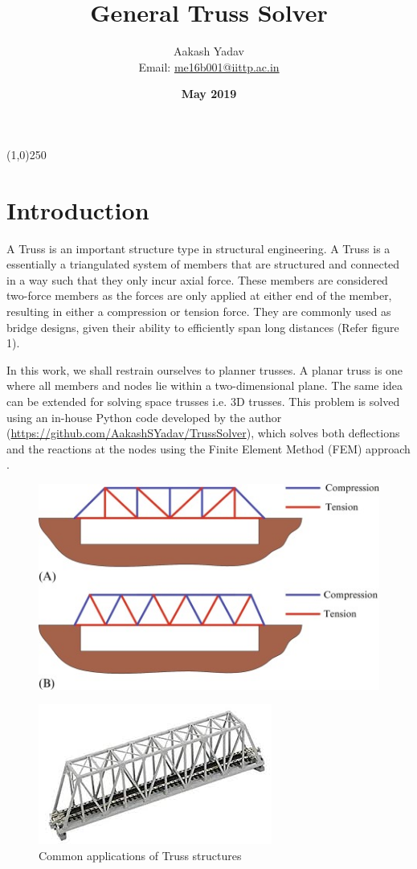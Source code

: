 \documentclass{article}
\title{\textbf{General Truss Solver}}
\author{Aakash Yadav\\ Email: \href{mailto:me16b001@iittp.ac.in}{me16b001@iittp.ac.in}}
\affil{\textbf{Indian Institute of Technology Tirupati}}
\date{\textbf{May 2019}}
\begin{document}
\maketitle

\begin{center}
\line(1,0){250}
\end{center}


\section{Introduction}
A Truss is an important structure type in structural engineering. A Truss is a essentially a triangulated system of members that are structured and connected in a way such that they only incur axial force. These members are considered two-force members as the forces are only applied at either end of the member, resulting in either a compression or tension force. They are commonly used as bridge designs, given their ability to efficiently span long distances (Refer figure 1). 

In this work, we shall restrain ourselves to planner trusses. A planar truss is one where all members and nodes lie within a two-dimensional plane. The same idea can be extended for solving space trusses i.e. 3D trusses. 
This problem is solved using an in-house Python code developed by the author (\href{https://github.com/AakashSYadav/TrussSolver}{https://github.com/AakashSYadav/TrussSolver}), which solves both deflections and the reactions at the nodes using the Finite Element Method (FEM) approach \citep{jnreddy}.

\begin{figure}[h!]
\centering
\includegraphics[scale=.6]{3.jpg}

\label{fig:fig1}
\end{figure}
\begin{figure}[h!]
\centering
\includegraphics[scale=.6]{4.jpeg}
\caption{Common applications of Truss structures}
\label{fig:fig1}
\end{figure}
\end{document}
